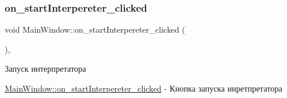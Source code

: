 \subsubsection{\texorpdfstring{on\+\_\+start\+Interpereter\+\_\+clicked}{on\_startInterpereter\_clicked}}
{\footnotesize\ttfamily void Main\+Window\+::on\+\_\+start\+Interpereter\+\_\+clicked (\begin{DoxyParamCaption}{ }\end{DoxyParamCaption})\hspace{0.3cm}{\ttfamily [private]}, {\ttfamily [slot]}}



Запуск интерпретатора 

\hyperlink{class_main_window_a4b11549301823f52f40c90715cc70ec5}{Main\+Window\+::on\+\_\+start\+Interpereter\+\_\+clicked} -\/ Кнопка запуска инретпретатора


